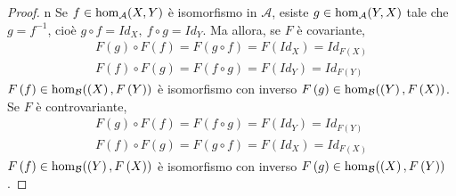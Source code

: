 \begin{proof}{n}
	Se $f\in \homo[\mathcal{A}]{X,Y}$ è isomorfismo in $\mathcal{A}$, esiste $g\in\homo[\mathcal{A}]{Y,X}$ tale che $g=f^{-1}$, cioè $g\circ f=Id_X,\ f\circ g=Id_Y$. Ma allora, se $F$ è covariante,
	\begin{gather*}
		F\left(g\right)\circ F\left(f\right)=F\left(g\circ f\right)=F\left(Id_X\right)=Id_{F\left(X\right)}\\
		F\left(f\right)\circ F\left(g\right)=F\left(f\circ g\right)=F\left(Id_Y\right)=Id_{F\left(Y\right)}
	\end{gather*}
$F\left(f\right)\in\homo[\mathcal{B}]{\left(X\right),F\left(Y\right)}$ è isomorfismo con inverso $F\left(g\right)\in\homo[\mathcal{B}]{\left(Y\right),F\left(X\right)}$. Se $F$ è controvariante,
\begin{gather*}
	F\left(g\right)\circ F\left(f\right)=F\left(f\circ g\right)=F\left(Id_Y\right)=Id_{F\left(Y\right)}\\
	F\left(f\right)\circ F\left(g\right)=F\left(g\circ f\right)=F\left(Id_X\right)=Id_{F\left(X\right)}
\end{gather*}
$F\left(f\right)\in\homo[\mathcal{B}]{\left(Y\right),F\left(X\right)}$ è isomorfismo con inverso $F\left(g\right)\in\homo[\mathcal{B}]{\left(X\right),F\left(Y\right)}$.\qedhere
\end{proof}
